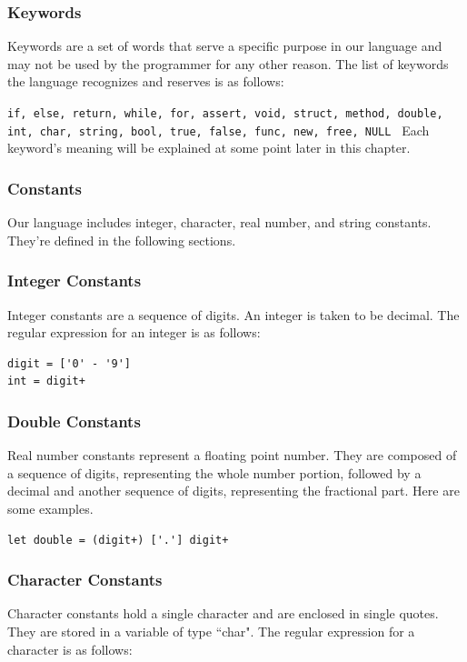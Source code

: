 \documentclass{article}
\begin{document}
\subsubsection{Keywords}
Keywords are a set of words that serve a specific purpose in our language and may not be used by the programmer for any other reason. The list of keywords the language recognizes and reserves is as follows: 

\texttt{if, else, return, while, for, assert, void, struct, method, double, int, char, string, bool, true, false, func, new, free, NULL }
Each keyword's meaning will be explained at some point later in this chapter.

\subsubsection{Constants}
Our language includes integer, character, real number, and string constants. They're defined in the following sections.

\subsubsection{Integer Constants}
Integer constants are a sequence of digits. An integer is taken to be decimal. The regular expression for an integer is as follows:

\begin{Verbatim}[frame=single]
digit = ['0' - '9']
int = digit+
\end{Verbatim}

\subsubsection{Double Constants}
Real number constants represent a floating point number. They are composed of a sequence of digits, representing the whole number portion, followed by a decimal and another sequence of digits, representing the fractional part. Here are some examples.

\begin{Verbatim}[frame=single]
let double = (digit+) ['.'] digit+
\end{Verbatim}

\subsubsection{Character Constants}
Character constants hold a single character and are enclosed in single quotes. They are stored in a variable of type ``char". The regular expression for a character is as follows:
\end{document}
